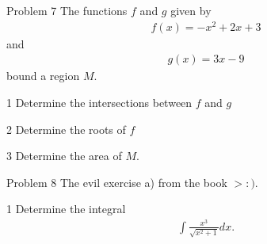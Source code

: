 \begin{opgavetekst}{Problem 7}
	The functions $f$ and $g$ given by 
	\begin{align*}
		f(x) = -x^2 + 2x +3
	\end{align*}
	and 
	\begin{align*}
		g(x) = 3x-9
	\end{align*}
	bound a region $M$.
\end{opgavetekst}
\begin{delopgave}{1}
	Determine the intersections between $f$ and $g$
\end{delopgave}
\begin{delopgave}{2}
	Determine the roots of $f$
\end{delopgave}
\begin{delopgave}{3}
	Determine the area of $M$. 
\end{delopgave}

\begin{opgavetekst}{Problem 8}
	The evil exercise a) from the book $>:)$. 
\end{opgavetekst}
\begin{delopgave}{1}
	Determine the integral
		\begin{align*}
			\int \frac{x^3}{\sqrt{x^2+1}}dx.
		\end{align*}
\end{delopgave}